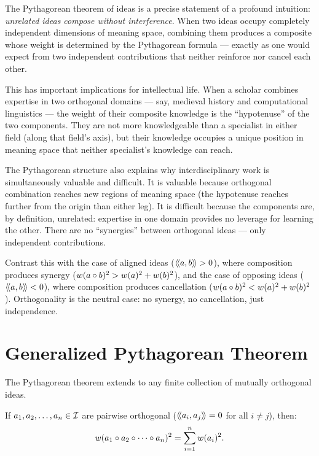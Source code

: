 \begin{interpretation}
\label{interp:pythagoras}
The Pythagorean theorem of ideas is a precise statement of a profound
intuition: \emph{unrelated ideas compose without interference}. When two
ideas occupy completely independent dimensions of meaning space, combining
them produces a composite whose weight is determined by the Pythagorean
formula --- exactly as one would expect from two independent contributions
that neither reinforce nor cancel each other.

This has important implications for intellectual life. When a scholar combines
expertise in two orthogonal domains --- say, medieval history and computational
linguistics --- the weight of their composite knowledge is the ``hypotenuse''
of the two components. They are not more knowledgeable than a specialist in
either field (along that field's axis), but their knowledge occupies a unique
position in meaning space that neither specialist's knowledge can reach.

The Pythagorean structure also explains why interdisciplinary work is
simultaneously valuable and difficult. It is valuable because orthogonal
combination reaches new regions of meaning space (the hypotenuse reaches
further from the origin than either leg). It is difficult because the
components are, by definition, unrelated: expertise in one domain provides no
leverage for learning the other. There are no ``synergies'' between orthogonal
ideas --- only independent contributions.

Contrast this with the case of aligned ideas ($\langle\!\langle a, b \rangle\!\rangle > 0$), where
composition produces synergy ($w(a \circ b)^2 > w(a)^2 + w(b)^2$), and the
case of opposing ideas ($\langle\!\langle a, b \rangle\!\rangle < 0$), where composition produces
cancellation ($w(a \circ b)^2 < w(a)^2 + w(b)^2$). Orthogonality is the
neutral case: no synergy, no cancellation, just independence.
\end{interpretation}


\section{Generalized Pythagorean Theorem}

The Pythagorean theorem extends to any finite collection of mutually orthogonal
ideas.

\begin{theorem}
\label{thm:gen-pythagoras}
If $a_1, a_2, \ldots, a_n \in \mathcal{I}$ are pairwise orthogonal ($\langle\!\langle a_i, a_j \rangle\!\rangle = 0$
for all $i \neq j$), then:
\[
  w(a_1 \circ a_2 \circ \cdots \circ a_n)^2
  = \sum_{i=1}^n w(a_i)^2.
\]
\end{theorem}

